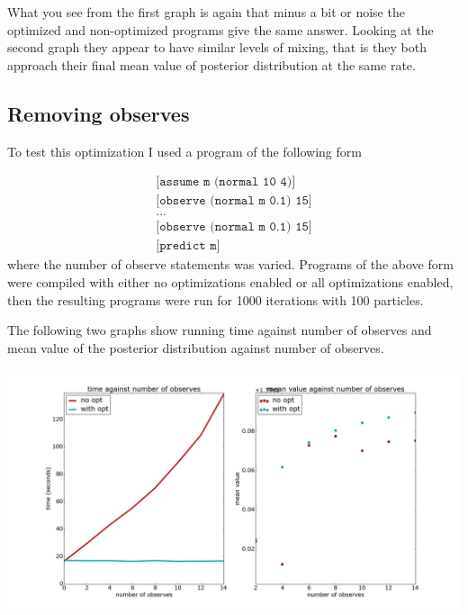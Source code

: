 \documentclass[a4paper]{article}
\begin{document}
What you see from the first graph is again that minus a bit or noise the optimized and non-optimized programs give the same answer. Looking at the second graph they appear to have similar levels of mixing, that is they both approach their final mean value of posterior distribution at the same rate.




\subsection{Removing observes}

To test this optimization I used a program of the following form

\[
	\begin{array}{l}
		\texttt{[assume m (normal 10 4)]} \\
		\texttt{[observe (normal m 0.1) 15]} \\
		\texttt{...} \\
		\texttt{[observe (normal m 0.1) 15]} \\
		\texttt{[predict m]}
	\end{array}
\]
where the number of observe statements was varied. Programs of the above form were compiled with either no optimizations enabled or all optimizations enabled, then the resulting programs were run for 1000 iterations with 100 particles.

The following two graphs show running time against number of observes and mean value of the posterior distribution against number of observes.

\centerline{\includegraphics[width=16cm]{images/removing_observes_1.png}}
\end{document}
